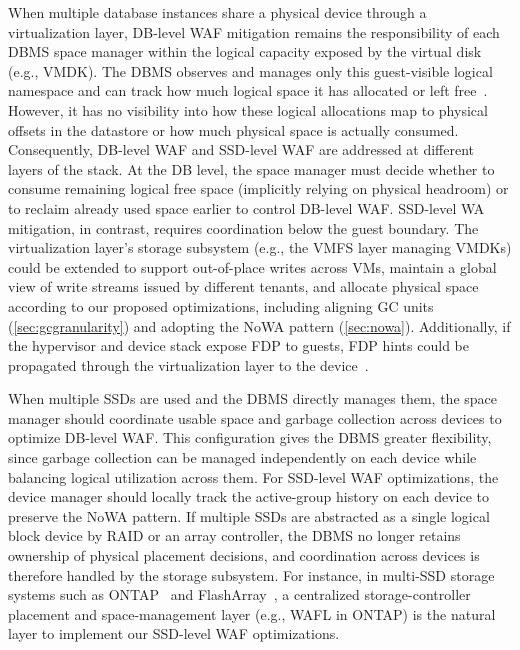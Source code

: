 When multiple database instances share a physical device through a virtualization layer, DB-level WAF mitigation remains the responsibility of each DBMS space manager within the logical capacity exposed by the virtual disk (e.g., VMDK).
The DBMS observes and manages only this guest-visible logical namespace and can track how much logical space it has allocated or left free~\cite{vmware-vsphere-vmfs}.
However, it has no visibility into how these logical allocations map to physical offsets in the datastore or how much physical space is actually consumed.
Consequently, DB-level WAF and SSD-level WAF are addressed at different layers of the stack.
At the DB level, the space manager must decide whether to consume remaining logical free space (implicitly relying on physical headroom) or to reclaim already used space earlier to control DB-level WAF.
SSD-level WA mitigation, in contrast, requires coordination below the guest boundary.
The virtualization layer’s storage subsystem (e.g., the VMFS layer managing VMDKs) could be extended to support out-of-place writes across VMs, maintain a global view of write streams issued by different tenants, and allocate physical space according to our proposed optimizations, including aligning GC units (\cref{sec:gcgranularity}) and adopting the NoWA pattern (\cref{sec:nowa}).
Additionally, if the hypervisor and device stack expose FDP to guests, FDP hints could be propagated through the virtualization layer to the device~\cite{SNIA_SDC_2025_SSDVirtualization}.

When multiple SSDs are used and the DBMS directly manages them, the space manager should coordinate usable space and garbage collection across devices to optimize DB-level WAF.
This configuration gives the DBMS greater flexibility, since garbage collection can be managed independently on each device while balancing logical utilization across them.
For SSD-level WAF optimizations, the device manager should locally track the active-group history on each device to preserve the NoWA pattern.
If multiple SSDs are abstracted as a single logical block device by RAID or an array controller, the DBMS no longer retains ownership of physical placement decisions, and coordination across devices is therefore handled by the storage subsystem.
For instance, in multi-SSD storage systems such as ONTAP~\cite{DBLP:conf/fast/Curtis-MauryKRM24} and FlashArray~\cite{PureStorageFlashArrayArchitecture}, a centralized storage-controller placement and space-management layer (e.g., WAFL in ONTAP) is the natural layer to implement our SSD-level WAF optimizations.

